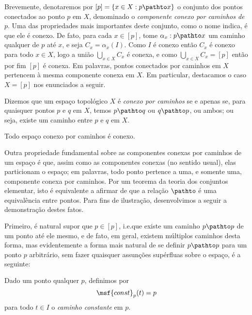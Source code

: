 Brevemente, denotaremos por $[p] = \{ x \in X : p \pathto x \}$ o conjunto dos pontos conectados ao ponto $p$ em $X$, denominado o \emph{componente conexo por caminhos de $p$}. Uma das propriedades mais importantes deste conjunto, como o nome indica, é que ele é conexo. De fato, para cada $x \in [p]$, tome $\alpha_x : p \pathto x$ um caminho qualquer de $p$ até $x$, e seja $C_x = \alpha_x(I)$. Como $I$ é conexo então $C_x$ é conexo para todo $x \in X$, logo a união $\bigcup_{x \in X} C_x$ é conexa, e como $\bigcup_{x \in X} C_x = [p]$ então por fim $[p]$ é conexa. Em palavras, pontos conectados por caminhos em $X$ pertencem à mesma componente conexa em $X$. Em particular, destacamos o caso $X = [p]$ nos enunciados a seguir.%
\linebreak\vspace{-1.2em}

\vspace{0.5em}

\begin{definition}
    Dizemos que um espaço topológico $X$ é \emph{conexo por caminhos} se e apenas se, para quaisquer pontos $p$ e $q$ em $X$, temos $p \pathto q$ ou $q \pathto p$, ou ambos; ou seja, existe um caminho entre $p$ e $q$ em $X$.
    \qedalt
\end{definition}

\begin{corollary}
    Todo espaço conexo por caminhos é conexo.
\end{corollary}

Outra propriedade fundamental sobre as componentes conexas por caminhos de um espaço é que, assim como as componentes conexas (no sentido usual), elas particionam o espaço; em palavras, todo ponto pertence a uma, e somente uma, componente conexa por caminhos. Por um teorema da teoria dos conjuntos elementar, isto é equivalente a afirmar de que a relação $\pathto$ é uma equivalência entre pontos. Para fins de ilustração, desenvolvimos a seguir a demonstração destes fatos.

Primeiro, é natural supor que $p \in [p]$, i.e.\@ que existe um caminho $p \pathto p$ de um ponto até ele mesmo, e de fato, em geral, existem múltiplos caminhos desta forma, mas evidentemente a forma mais natural de se definir $p \pathto p$ para um ponto $p$ arbitrário, sem fazer quaisquer assunções supérfluas sobre o espaço, é a seguinte:

\vspace{0.5em}

\begin{definition}
    Dado um ponto qualquer $p$, definimos por
%
    \begin{equation*}
        \msf{const}_p(t) = p
    \end{equation*}
%
    para todo $t \in I$ o \emph{caminho constante} em $p$.
    \qedalt
\end{definition}

